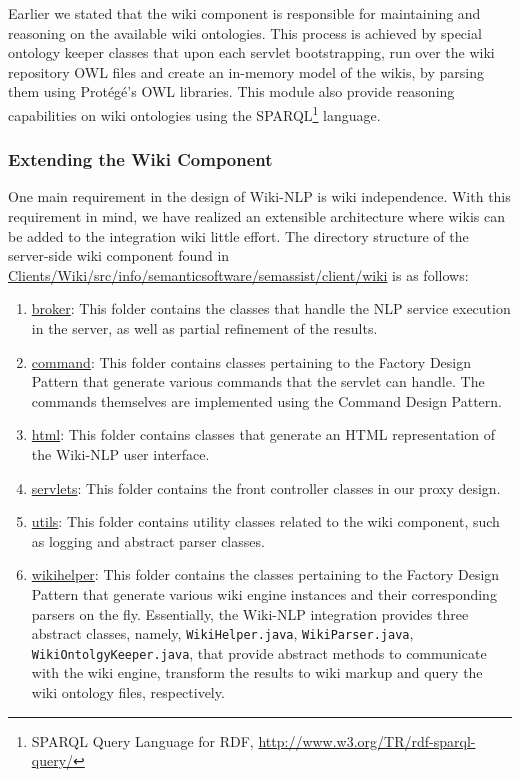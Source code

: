 Earlier we stated that the wiki component is responsible for maintaining and reasoning on the available wiki ontologies. This process is achieved by special ontology keeper classes that upon each servlet bootstrapping, run over the wiki repository OWL files and create an in-memory model of the wikis, by parsing them using Prot\'{e}g\'{e}'s OWL libraries. This module also provide reasoning capabilities on wiki ontologies using the SPARQL\footnote{SPARQL Query Language for RDF, \url{http://www.w3.org/TR/rdf-sparql-query/}} language.

\subsubsection{Extending the Wiki Component}
One main requirement in the design of Wiki-NLP is wiki independence. With this requirement in mind, we have realized an extensible architecture where wikis can be added to the integration wiki little effort. The directory structure of the server-side wiki component found in \url{Clients/Wiki/src/info/semanticsoftware/semassist/client/wiki} is as follows:

\begin{enumerate}
\item\url{broker}: This folder contains the classes that handle the NLP service execution in the \sa server, as well as partial refinement of the results.
\item\url{command}: This folder contains classes pertaining to the Factory Design Pattern that generate various commands that the servlet can handle. The commands themselves are implemented using the Command Design Pattern. 
\item\url{html}: This folder contains classes that generate an HTML representation of the Wiki-NLP user interface.
\item\url{servlets}: This folder contains the front controller classes in our proxy design.
\item\url{utils}: This folder contains utility classes related to the wiki component, such as logging and abstract parser classes.
\item\url{wikihelper}: This folder contains the classes pertaining to the Factory Design Pattern that generate various wiki engine instances and their corresponding parsers on the fly. Essentially, the Wiki-NLP integration provides three abstract classes, namely, \texttt{WikiHelper.java}, \texttt{WikiParser.java}, \texttt{WikiOntolgyKeeper.java}, that provide abstract methods to communicate with the wiki engine, transform the results to wiki markup and query the wiki ontology files, respectively. 
\end{enumerate}


